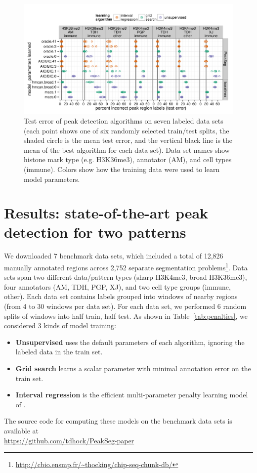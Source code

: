 \documentclass{article}
\begin{document}
\begin{figure}[b!]
  \centering
  \includegraphics[width=\textwidth]{figure-dp-peaks-regression-dots}
  \vskip -0.5cm
  \caption{Test error of peak detection algorithms on seven labeled
    data sets (each point shows one of six randomly selected
    train/test splits, the shaded circle is the mean test error, and
    the vertical black line is the mean of the best algorithm for each
    data set). Data set names show histone mark type (e.g. H3K36me3),
    annotator (AM), and cell types (immune). Colors show how the
    training data were used to learn model parameters.}
  \label{fig:test-error}
\end{figure}

\section{Results: state-of-the-art peak detection
  for two patterns}
\label{sec:results}

We downloaded 7 benchmark data sets, which included a total of 12,826
manually annotated regions across 2,752 separate segmentation
problems\footnote{\url{http://cbio.ensmp.fr/~thocking/chip-seq-chunk-db/}}.
Data sets span two different data/pattern types (sharp H3K4me3, broad
H3K36me3), four annotators (AM, TDH, PGP, XJ), and two cell type
groups (immune, other). Each data set contains labels grouped into
windows of nearby regions (from 4 to 30 windows per data set). For
each data set, we performed 6 random splits of windows into half
train, half test.  As shown in Table~\ref{tab:penalties}, we
considered 3 kinds of model training:
\begin{itemize}
\item \textbf{Unsupervised} uses the default parameters of each
  algorithm, ignoring the labeled data in the train set.
\item \textbf{Grid search} learns a scalar parameter with minimal
  annotation error on the train set.
\item \textbf{Interval regression} is the efficient multi-parameter
  penalty learning model of \citet{HOCKING-penalties}.
\end{itemize}
The source code for computing these models on the benchmark data sets 
is available at\\
\url{https://github.com/tdhock/PeakSeg-paper}
\end{document}
